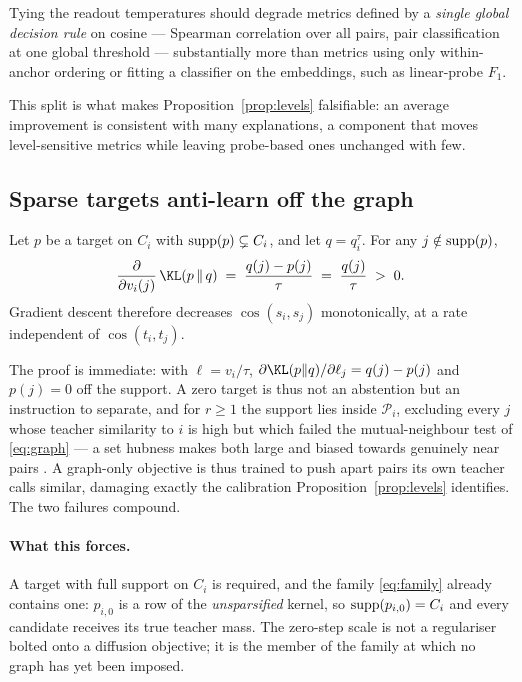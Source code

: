 \begin{prediction}
\label{pred:levels}
Tying the readout temperatures should degrade metrics defined by a \emph{single global
decision rule} on cosine --- Spearman correlation over all pairs, pair classification at one
global threshold --- substantially more than metrics using only within-anchor ordering or
fitting a classifier on the embeddings, such as linear-probe $F_1$.
\end{prediction}

This split is what makes Proposition~\ref{prop:levels} falsifiable: an average improvement is
consistent with many explanations, a component that moves level-sensitive metrics while
leaving probe-based ones unchanged with few.

\subsection{Sparse targets anti-learn off the graph}
\label{sec:support}

\begin{proposition}
\label{prop:support}
Let $p$ be a target on $C_i$ with $\mathrm{supp}(p)\subsetneq C_i$, and let
$q=q_i^{\tau}$. For any $j\notin\mathrm{supp}(p)$,
\begin{equation}
    \frac{\partial}{\partial v_i(j)}\,\KL\!\left(p\,\Vert\,q\right)
    \;=\;
    \frac{q(j) - p(j)}{\tau}
    \;=\;
    \frac{q(j)}{\tau}
    \;>\; 0 .
    \label{eq:zerograd}
\end{equation}
Gradient descent therefore decreases $\cos(s_i,s_j)$ monotonically, at a rate independent
of $\cos(t_i,t_j)$.
\end{proposition}

The proof is immediate: with $\ell = v_i/\tau$,
$\partial\KL(p\Vert q)/\partial \ell_j = q(j)-p(j)$ and $p(j)=0$ off the support. A zero
target is thus not an abstention but an instruction to separate, and for $r\geq1$ the support
lies inside $\mathcal{P}_i$, excluding every $j$ whose teacher similarity to $i$ is high but
which failed the mutual-neighbour test of \eqref{eq:graph} --- a set hubness makes both large
and biased towards genuinely near pairs \citep{radovanovic2010hubs}. A graph-only objective
is thus trained to push apart pairs its own teacher calls similar, damaging exactly the
calibration Proposition~\ref{prop:levels} identifies. The two failures compound.

\paragraph{What this forces.} A target with full support on $C_i$ is required, and the
family \eqref{eq:family} already contains one: $p_{i,0}$ is a row of the
\emph{unsparsified} kernel, so $\mathrm{supp}(p_{i,0})=C_i$ and every candidate receives its true
teacher mass. The zero-step scale is not a regulariser bolted onto a diffusion objective;
it is the member of the family at which no graph has yet been imposed.

